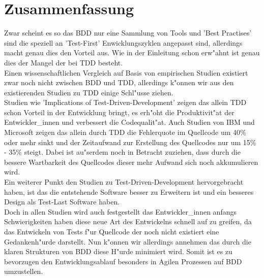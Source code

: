 \section{Zusammenfassung}
  Zwar scheint es so das BDD nur eine Sammlung von Tools und 'Best Practises' 
  sind die speziell an 'Test-First' Enwicklungszyklen angepasst sind, allerdings
  macht genau dies den Vorteil aus. Wie in der Einleitung schon erw"ahnt ist
  genau dies der Mangel der bei TDD besteht.\\
  Einen wissenschaftlichen Vergleich auf Basis von empirischen Studien existiert
  zwar noch nicht zwischen BDD und TDD, allerdings k"onnen wir aus den 
  existierenden Studien zu TDD einige Schl"usse ziehen.\\
  Studien wie 'Implications of Test-Driven-Development' \cite{Kaufmann:Janzen:2003}
  zeigen das allein TDD schon Vorteil in der Entwicklung bringt, es erh"oht die 
  Produktivit"at der Entwickler\_innen und verbessert die Codequalit"at. 
  Auch Studien von IBM und Microsoft \cite{IBM:Microsoft:2008} zeigen das allein
  durch TDD die Fehlerquote im Quellcode um 40\% oder mehr sinkt und der 
  Zeitaufwand zur Erstellung des Quellcodes nur um 15\% - 35\% steigt.
  Dabei ist au"serdem noch in Betracht zuziehen, dass durch die bessere Wartbarkeit
  des Quellcodes dieser mehr Aufwand sich noch akkumulieren wird.\\
  Ein weiterer Punkt den Studien zu Test-Driven-Development hervorgebracht 
  haben, ist das die entstehende Software besser zu Erweitern ist und ein 
  besseres Design als Test-Last Software haben.\cite{Janzen:2006}\\
  Doch in allen Studien wird auch festgestellt das Entwickler\_innen anfangs
  Schwierigkeiten haben diese neue Art des Entwickelns schnell auf zu greifen,
  da das Entwickeln von Tests f"ur Quellcode der noch nicht existiert eine
  Gedankenh"urde darstellt. Nun k"onnen wir allerdings annehmen das durch
  die klaren Strukturen von BDD diese H"urde minimiert wird. Somit ist es zu 
  bevorzugen den Entwicklungsablauf besonders in Agilen Prozessen auf BDD
  umzustellen.\\